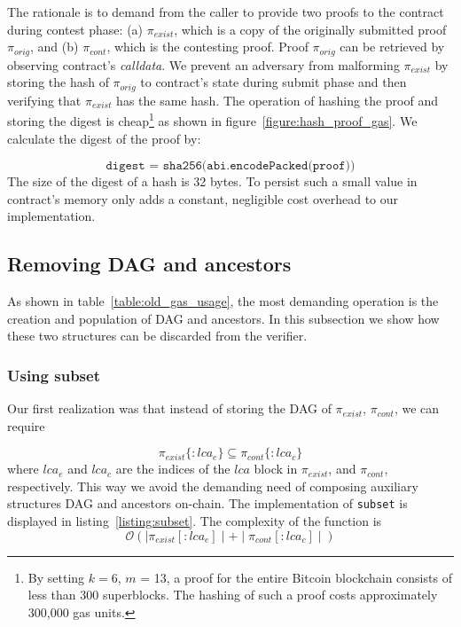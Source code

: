 The rationale is to demand from the caller to provide two proofs to the
contract during contest phase: (a) $\pi_{exist}$, which is a copy of the
originally submitted proof $\pi_{orig}$, and (b) $\pi_{cont}$, which is the
contesting proof. Proof $\pi_{orig}$ can be retrieved by observing contract's
\textit{calldata}. We prevent an adversary from malforming $\pi_{exist}$ by
storing the hash of $\pi_{orig}$ to contract's state during submit phase and
then verifying that $\pi_{exist}$ has the same hash. The operation of hashing
the proof and storing the digest is cheap\footnote{By setting $k=6$, $m$ = 13,
a proof for the entire Bitcoin blockchain consists of less than 300
superblocks. The hashing of such a proof costs approximately 300,000 gas
units.} as shown in figure~\ref{figure:hash_proof_gas}. We calculate the digest
of the proof by:

\[\texttt{digest = sha256(abi.encodePacked(proof))}\] The size of the digest of
a hash is 32 bytes. To persist such a small value in contract's memory only
adds a constant, negligible cost overhead to our implementation.



\subsection{Removing DAG and ancestors}

As shown in table~\ref{table:old_gas_usage}, the most demanding operation is
the creation and population of DAG and ancestors. In this subsection we show
how these two structures can be discarded from the verifier.

\subsubsection{Using subset} Our first realization was that instead of storing the
DAG of $\pi_{exist}$, $\pi_{cont}$, we can require

\[ \pi_{exist}\{:lca_{e}\} \subseteq \pi_{cont}\{:lca_{c}\} \]
where $lca_{e}$ and $lca_{c}$ are the indices of the $lca$ block in
$\pi_{exist}$, and $\pi_{cont}$, respectively. This way we avoid
the demanding need of composing auxiliary structures DAG and ancestors
on-chain. The implementation of \texttt{subset} is displayed in
listing~\ref{listing:subset}. The complexity of the function is
\[ \mathcal{O}(\mid\pi_{exist}[:lca_{e}]\mid + \mid\pi_{cont}[:lca_{c}]\mid) \]



